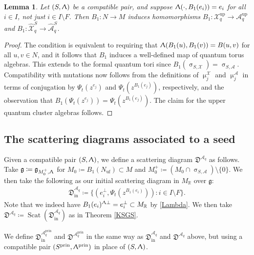 \documentclass{amsart}
\DeclareMathOperator{\prin}{prin}
\DeclareMathOperator{\In}{in}
\DeclareMathOperator{\up}{up}
\DeclareMathOperator{\scat}{Scat}
\DeclareMathOperator{\uf}{uf}
\let\bb=\mathbb
\let\rar=\rightarrow
\let\f=\mathfrak
\let\s=\mathcal
\let\wh=\widehat
\renewcommand{\sigma}{\upsigma}
\renewcommand{\Lambda}{\Uplambda}
\renewcommand{\mu}{\upmu}
\theoremstyle{plain}%
\newtheorem{lem}[thm]{Lemma}
\theoremstyle{definition}
\theoremstyle{remark}
\begin{document}
\begin{lem}\label{pi1}
Let $(S,\Lambda)$ be a compatible pair, and suppose $\Lambda(\cdot,B_1(e_i))=e_i$ for all $i\in I$, not just $i\in I\setminus F$.  Then $B_1\colon N\rar M$ induces homomorphisms $B_1\colon \s{X}_q^{\up} \rar \s{A}_q^{\up}$ and $B_1\colon \wh{\s{X}}_q^S\rar \wh{\s{A}}_q^{S}$. 
\end{lem}
\begin{proof}
The condition is equivalent to requiring that $\Lambda(B_1(u),B_1(v))=B(u,v)$ for all $u,v\in N$, and it follows that $B_1$ induces a well-defined map of quantum torus algebras.  This extends to the formal quantum tori since $B_1(\sigma_{S,\s{X}})=\sigma_{S,\s{A}}$.   Compatibility with mutations now follows from the definitions of $\mu_j^{\s{X}}$ and $\mu_j^{\s{A}}$ in terms of conjugation by $\Psi_t(z^{e_j})$ and $\Psi_t(z^{B_1(e_j)})$, respectively, and the observation that $B_1(\Psi_t(z^{e_j})) = \Psi_t(z^{B_1(e_j)})$.  The claim for the upper quantum cluster algebras follows.
\end{proof}


\subsection{The scattering diagrams associated to a seed}\label{Initial}


Given a compatible pair $(S,\Lambda)$, we define a scattering diagram $\f{D}^{\s{A}_q}$ as follows.  Take $\f{g}\coloneqq \f{g}_{M_0^+,\Lambda}$ for $M_0\coloneqq B_1(N_{\uf})\subset M$ and $M_0^+\coloneqq (M_0\cap \sigma_{S,\s{A}})\setminus \{0\}$. 
We then take the following as our initial scattering diagram in $M_{\bb{R}}$ over $\f{g}$:
\begin{align*}
    \f{D}^{\s{A}_q}_{\In}\coloneqq \{(e_i^{\perp},\Psi_t(z^{B_1(e_i)}))\colon i\in I\setminus F\}.
\end{align*}
Note that we indeed have $B_1(e_i)^{\Lambda\perp}=e_i^{\perp}\subset M_{\bb{R}}$ by \eqref{Lambda}.  We then take $\f{D}^{\s{A}_q}\coloneqq \scat(\f{D}^{\s{A}_q}_{\In})$ as in Theorem \ref{KSGS}.  


We define $\f{D}_{\In}^{\s{A}_q^{\prin}}$ and $\f{D}^{\s{A}_q^{\prin}}$ in the same way as $\f{D}_{\In}^{\s{A}_q}$ and $\f{D}^{\s{A}_q}$ above, but using a compatible pair $(S^{\prin},\Lambda^{\prin})$ in place of $(S,\Lambda)$.
\end{document}
